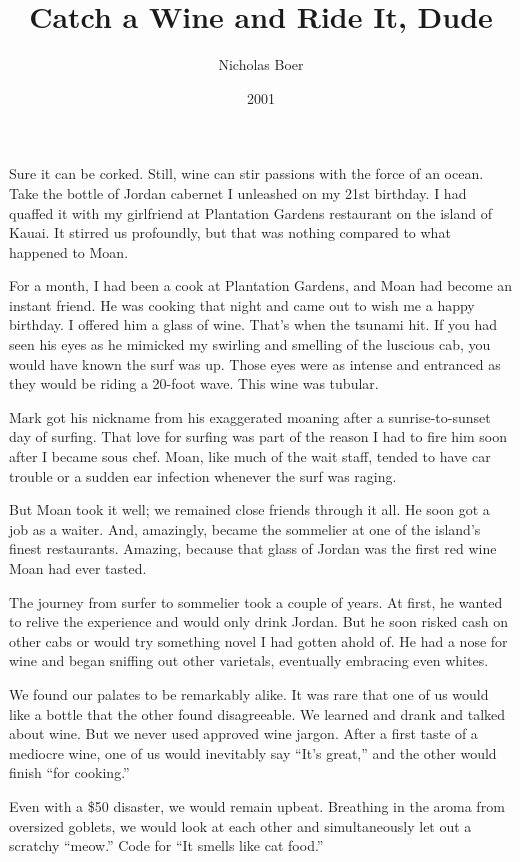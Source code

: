 \documentclass[12pt]{article}
\title{Catch a Wine and Ride It, Dude}
\author{Nicholas Boer}
\date{2001}
\begin{document}
\maketitle

Sure it can be corked.
Still, wine can stir passions with the force of an ocean.
Take the bottle of Jordan cabernet I unleashed on my 21st birthday.
I had quaffed it with my girlfriend at Plantation Gardens restaurant on the island of Kauai.
It stirred us profoundly, but that was nothing compared to what happened to Moan.

For a month, I had been a cook at Plantation Gardens, and Moan had become an instant friend.
He was cooking that night and came out to wish me a happy birthday.
I offered him a glass of wine.
That's when the tsunami hit.
If you had seen his eyes as he mimicked my swirling and smelling of the luscious cab, you would have known the surf was up.
Those eyes were as intense and entranced as they would be riding a 20-foot wave.
This wine was tubular.

Mark got his nickname from his exaggerated moaning after a sunrise-to-sunset day of surfing.
That love for surfing was part of the reason I had to fire him soon after I became sous chef.
Moan, like much of the wait staff, tended to have car trouble or a sudden ear infection whenever the surf was raging.

But Moan took it well; we remained close friends through it all.
He soon got a job as a waiter.
And, amazingly, became the sommelier at one of the island's finest restaurants.
Amazing, because that glass of Jordan was the first red wine Moan had ever tasted.

The journey from surfer to sommelier took a couple of years.
At first, he wanted to relive the experience and would only drink Jordan.
But he soon risked cash on other cabs or would try something novel I had gotten ahold of.
He had a nose for wine and began sniffing out other varietals, eventually embracing even whites.

We found our palates to be remarkably alike.
It was rare that one of us would like a bottle that the other found disagreeable.
We learned and drank and talked about wine.
But we never used approved wine jargon.
After a first taste of a mediocre wine, one of us would inevitably say ``It's great,'' and the other would finish ``for cooking.''

Even with a \$50 disaster, we would remain upbeat.
Breathing in the aroma from oversized goblets, we would look at each other and simultaneously let out a scratchy ``meow.''
Code for ``It smells like cat food.''
\end{document}
